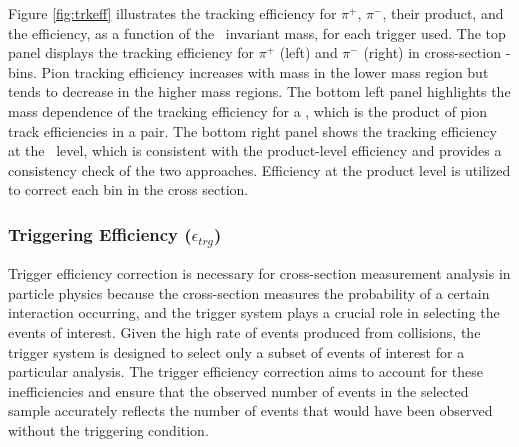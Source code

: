 Figure \ref{fig:trkeff} illustrates the tracking efficiency for $\pi^+$, $\pi^-$, their product, and the \dipion efficiency, as a function of the \dipion\ invariant mass, for each trigger used.  The top panel displays the tracking efficiency for $\pi^+$ (left) and $\pi^-$ (right) in cross-section \mpair - bins. Pion tracking efficiency increases with mass in the lower mass region but tends to decrease in the higher mass regions. The bottom left panel highlights the mass dependence of the tracking efficiency for a \dipion, which is the product of pion track efficiencies in a pair. The bottom right panel shows the tracking efficiency at the \dipion\ level, which is consistent with the product-level efficiency and provides a consistency check of the two approaches. Efficiency at the product level is utilized to correct each bin in the cross section.
 
 \subsubsection{Triggering Efficiency ($\epsilon_{trg}$)}
 \label{subsec:trigeff}
Trigger efficiency correction is necessary for cross-section measurement analysis in particle physics because the cross-section measures the probability of a certain interaction occurring, and the trigger system plays a crucial role in selecting the events of interest. Given the high rate of events produced from collisions, the trigger system is designed to select only a subset of events of interest for a particular analysis. The trigger efficiency correction aims to account for these inefficiencies and ensure that the observed number of events in the selected sample accurately reflects the number of events that would have been observed without the triggering condition.  
 
